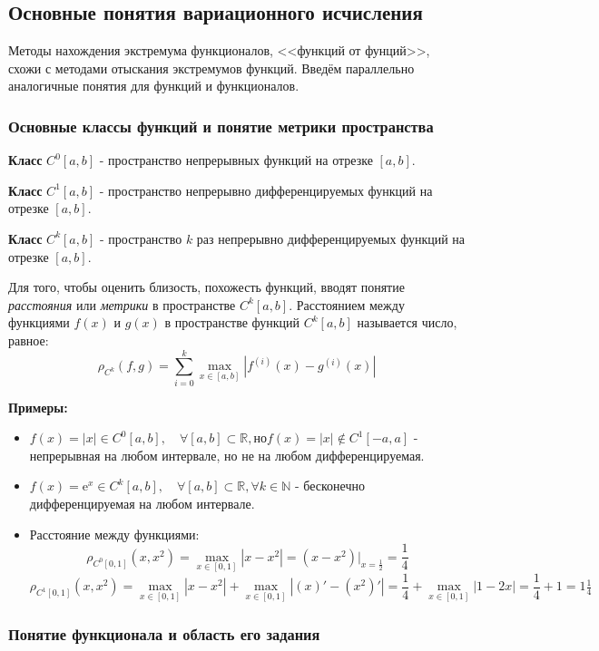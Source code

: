 \documentclass[12pt, a4paper]{article}
\begin{document}
\subsection{Основные понятия вариационного исчисления}

Методы нахождения экстремума функционалов, <<функций от фунций>>, схожи с методами отыскания экстремумов функций. Введём параллельно аналогичные понятия для функций и функционалов.

\subsubsection{Основные классы функций и понятие метрики пространства}

\textbf{Класс} $C^0[a, b]$ - пространство непрерывных функций на отрезке $[a, b]$.

\textbf{Класс} $C^1[a, b]$ - пространство непрерывно дифференцируемых функций на отрезке $[a, b]$.

\textbf{Класс} $C^k[a, b]$ - пространство $k$ раз непрерывно дифференцируемых функций на отрезке $[a, b]$.

Для того, чтобы оценить близость, похожесть функций, вводят понятие \textit{расстояния} или \textit{метрики} в пространстве $C^k[a, b]$. Расстоянием между функциями $f(x)$ и $g(x)$ в пространстве функций $C^k[a, b]$ называется число, равное:
\[\rho_{C^k}(f, g) = \sum_{i=0}^k \max \limits_{x \in [a, b]} \left| f^{(i)}(x) - g^{(i)}(x) \right| \]

\textbf{Примеры:}
\begin{itemize}
 \item $f(x) = |x| \in C^0[a, b], \quad \forall [a, b] \subset \mathbb{R}, \textrm{но} f(x) = |x| \not\in C^1[-a, a]$ - непрерывная на любом интервале, но не на любом дифференцируемая.
 \item $f(x) = \mathrm{e}^x \in C^k[a, b], \quad \forall [a, b] \subset \mathbb{R}, \forall k \in \mathbb{N}$ - бесконечно дифференцируемая на любом интервале.
 \item Расстояние между функциями:
 \[\rho_{C^0[0, 1]}(x, x^2) = \max \limits_{x \in [0, 1]} \left| x - x^2 \right| = (x - x^2) |_{x=\tfrac{1}{2}} = \frac{1}{4} \]
 \[\rho_{C^1[0, 1]}(x, x^2) = \max \limits_{x \in [0, 1]} \left| x - x^2 \right| + \max \limits_{x \in [0, 1]} \left| (x)' - (x^2)' \right| = \frac{1}{4} + \max \limits_{x \in [0, 1]} |1-2x| = \frac{1}{4} + 1 = 1\tfrac{1}{4} \]
\end{itemize}

\subsubsection{Понятие функционала и область его задания}
\end{document}
